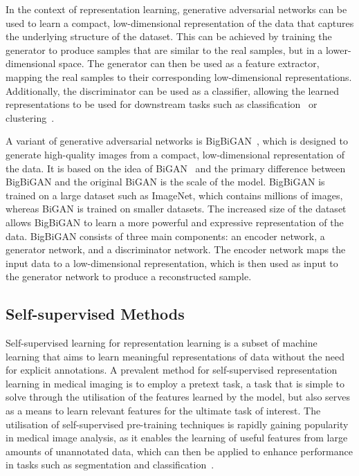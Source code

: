 In the context of representation learning, generative adversarial networks can be used to learn a compact, low-dimensional representation of the data that captures the underlying structure of the dataset. This can be achieved by training the generator to produce samples that are similar to the real samples, but in a lower-dimensional space. The generator can then be used as a feature extractor, mapping the real samples to their corresponding low-dimensional representations. Additionally, the discriminator can be used as a classifier, allowing the learned representations to be used for downstream tasks such as classification~\citep{srivastav2021improved} or clustering~\citep{mukherjee2019clustergan}.

A variant of generative adversarial networks is BigBiGAN~\citep{donahue2019large}, which is designed to generate high-quality images from a compact, low-dimensional representation of the data. It is based on the idea of BiGAN~\citep{donahue2016adversarial} and the primary difference between BigBiGAN and the original BiGAN is the scale of the model. BigBiGAN is trained on a large dataset such as ImageNet, which contains millions of images, whereas BiGAN is trained on smaller datasets. The increased size of the dataset allows BigBiGAN to learn a more powerful and expressive representation of the data. BigBiGAN consists of three main components: an encoder network, a generator network, and a discriminator network. The encoder network maps the input data to a low-dimensional representation, which is then used as input to the generator network to produce a reconstructed sample.

\subsection{Self-supervised Methods}
\label{subsec:self_supervised_methods}
Self-supervised learning for representation learning is a subset of machine learning that aims to learn meaningful representations of data without the need for explicit annotations. A prevalent method for self-supervised representation learning in medical imaging is to employ a pretext task, a task that is simple to solve through the utilisation of the features learned by the model, but also serves as a means to learn relevant features for the ultimate task of interest. The utilisation of self-supervised pre-training techniques is rapidly gaining popularity in medical image analysis, as it enables the learning of useful features from large amounts of unannotated data, which can then be applied to enhance performance in tasks such as segmentation and classification~\citep{shurrab2022self}.

